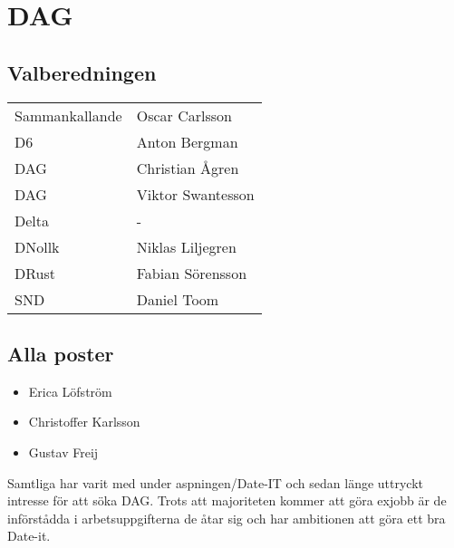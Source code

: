 \section{DAG}


\subsection{Valberedningen}
\begin{autoframe}

\begin{tabular}{ll}
Sammankallande & Oscar Carlsson \\
D6 & Anton Bergman \\
DAG  & Christian Ågren \\
DAG  & Viktor Swantesson \\
Delta  & - \\
DNollk & Niklas Liljegren \\
DRust & Fabian Sörensson \\
SND  & Daniel Toom
\end{tabular}
\end{autoframe}

\subsection{Alla poster}

\begin{autoframe}
\begin{itemize}
\item Erica Löfström
\item Christoffer Karlsson
\item Gustav Freij
\end{itemize}


\bigskip
Samtliga har varit med under aspningen/Date-IT och sedan länge uttryckt intresse för att söka DAG. Trots att majoriteten kommer att göra exjobb är de införstådda i arbetsuppgifterna de åtar sig och har ambitionen att göra ett bra Date-it.
\end{autoframe}
